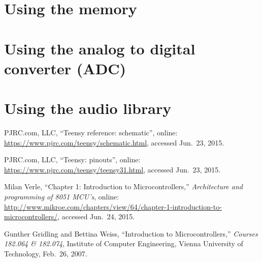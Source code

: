 \documentclass[letterpaper, 11pt]{article}
\begin{document}
\section{Using the memory}

\section{Using the analog to digital converter (ADC)}

\section{Using the audio library}


\begin{thebibliography}{9}

  PJRC.com, LLC, ``Teensy reference: schematic'', online: \url{https://www.pjrc.com/teensy/schematic.html}, accessed Jun.~23, 2015.

  PJRC.com, LLC, ``Teensy: pinouts'', online: \url{https://www.pjrc.com/teensy/teensy31.html}, accessed Jun.~23, 2015.

Milan Verle, ``Chapter 1: Introduction to Microcontrollers,'' \emph{Architecture and programming of 8051 MCU's}, online: \url{http://www.mikroe.com/chapters/view/64/chapter-1-introduction-to-microcontrollers/}, accessed Jun.~24, 2015.

Gunther Gridling and Bettina Weiss, ``Introduction to Microcontrollers,'' \emph{Courses 182.064 \& 182.074}, Institute of Computer Engineering, Vienna University of Technology, Feb.~26, 2007.


\end{thebibliography}
\end{document}
